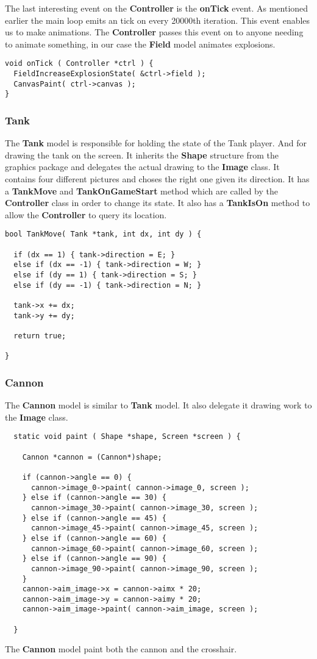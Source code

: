The last interesting event on the {\bf Controller} is the {\bf onTick} event. As mentioned earlier
the main loop emits an tick on every 20000th iteration. This event enables us to make animations.
The {\bf Controller} passes this event on to anyone needing to animate something, in our case the
{\bf Field} model animates explosions.
\begin{lstlisting}
void onTick ( Controller *ctrl ) {
  FieldIncreaseExplosionState( &ctrl->field );
  CanvasPaint( ctrl->canvas );
}
\end{lstlisting}


\subsubsection{Tank}
The {\bf Tank} model is responsible for holding the state of the Tank player. And for drawing the
tank on the screen. It inherits the {\bf Shape} structure from the graphics package and delegates
the actual drawing to the {\bf Image} class. It contains four different pictures and choses the
right one given its direction. It has a {\bf TankMove} and {\bf TankOnGameStart} method which are
called by the {\bf Controller} class in order to change its state. It also has a {\bf TankIsOn}
method to allow the {\bf Controller} to query its location.

\begin{lstlisting}
bool TankMove( Tank *tank, int dx, int dy ) {

  if (dx == 1) { tank->direction = E; }
  else if (dx == -1) { tank->direction = W; }
  else if (dy == 1) { tank->direction = S; }
  else if (dy == -1) { tank->direction = N; }

  tank->x += dx;
  tank->y += dy;

  return true;

}
\end{lstlisting}
\subsubsection{Cannon}
The {\bf Cannon} model is similar to {\bf Tank} model. It also delegate it drawing work to the {\bf
  Image} class.

\begin{lstlisting}
  static void paint ( Shape *shape, Screen *screen ) {

    Cannon *cannon = (Cannon*)shape;

    if (cannon->angle == 0) {
      cannon->image_0->paint( cannon->image_0, screen );
    } else if (cannon->angle == 30) {
      cannon->image_30->paint( cannon->image_30, screen );
    } else if (cannon->angle == 45) {
      cannon->image_45->paint( cannon->image_45, screen );
    } else if (cannon->angle == 60) {
      cannon->image_60->paint( cannon->image_60, screen );
    } else if (cannon->angle == 90) {
      cannon->image_90->paint( cannon->image_90, screen );
    }
    cannon->aim_image->x = cannon->aimx * 20;
    cannon->aim_image->y = cannon->aimy * 20;
    cannon->aim_image->paint( cannon->aim_image, screen );

  }
\end{lstlisting}
The {\bf Cannon} model paint both the cannon and the crosshair.

